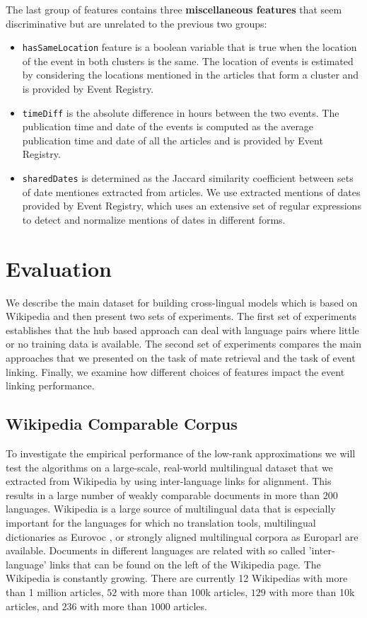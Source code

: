\documentclass[twoside,11pt]{article}
\begin{document}
The last group of features contains three {\bf miscellaneous features} that seem discriminative but are unrelated to the previous two groups:
\begin{itemize}
\item \texttt{hasSameLocation} feature is a boolean variable that is true when the location of the event in both clusters is the same. The location of events is estimated by considering the locations mentioned in the articles that form a cluster and is provided by Event Registry.
\item \texttt{timeDiff} is the absolute difference in hours between the two events. The publication time and date of the events is computed as the average publication time and date of all the articles and is provided by Event Registry.
\item \texttt{sharedDates} is determined as the Jaccard similarity coefficient between sets of date mentiones extracted from articles. We use extracted mentions of dates provided by Event Registry, which uses an extensive set of regular expressions to detect and normalize mentions of dates in different forms.
\end{itemize}


\section{Evaluation}

We describe the main dataset for building cross-lingual models which is based on Wikipedia and then present two sets of experiments. The first set of experiments
establishes that the hub based approach can deal with language pairs where little or no training data is available. The second set of experiments compares the main approaches
that we presented on the task of mate retrieval and the task of event linking. Finally, we examine how different choices of features impact the event linking performance.

\subsection{Wikipedia Comparable Corpus}

To investigate the empirical performance of the low-rank approximations we will test the algorithms on a large-scale, real-world multilingual dataset that we extracted from Wikipedia by using inter-language links for alignment. This  results in a large number of weakly comparable documents in more than $200$ languages. Wikipedia is a large source of multilingual data that is especially important for the languages for which no translation tools, multilingual dictionaries as Eurovoc \cite{eurovoc}, or strongly aligned multilingual corpora as Europarl \cite{europarl} are available. Documents in different languages are related with so called 'inter-language' links that can be found on the left of the Wikipedia page. The Wikipedia is constantly growing. There are currently 12 Wikipedias with more than 1 million %
 articles, $52$ with more than 100k %
 articles, $129$ with more than 10k articles, and $236$ with more than $1000$ articles.
\end{document}
